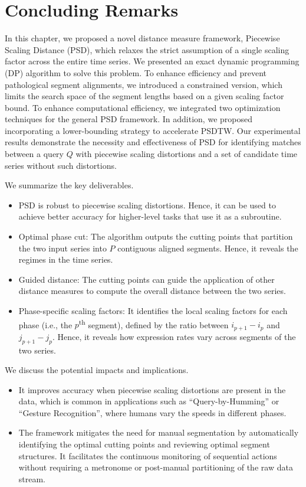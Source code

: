 \section{Concluding Remarks} \label{sec:conclusion} %

In this chapter, we proposed a novel distance measure framework, Piecewise Scaling Distance (PSD), which relaxes the strict assumption of a single scaling factor across the entire time series. 
%
We presented an exact dynamic programming (DP) algorithm to solve this problem.
To enhance efficiency and prevent pathological segment alignments, we introduced a constrained version, which limits the search space of the segment lengths based on a given scaling factor bound. 
%
To enhance computational efficiency, we integrated two optimization techniques for the general PSD framework.
In addition, we proposed incorporating a lower-bounding strategy to accelerate PSDTW.
Our experimental results demonstrate the necessity and effectiveness of PSD for identifying matches between a query $Q$ with piecewise scaling distortions and a set of candidate time series without such distortions.

We summarize the key deliverables.
\begin{itemize}
  \item PSD is robust to piecewise scaling distortions. Hence, it can be used to achieve better accuracy for higher-level tasks that use it as a subroutine.
  \item Optimal phase cut: The algorithm outputs the cutting points that partition the two input series into $P$ contiguous aligned segments.
  Hence, it reveals the regimes in the time series.
  \item Guided distance: The cutting points can guide the application of other distance measures to compute the overall distance between the two series.
  \item Phase-specific scaling factors: It identifies the local scaling factors for each phase (i.e., the $p$\textsuperscript{th} segment), defined by the ratio between $i_{p+1} - i_p$ and $j_{p+1} - j_p$. 
  Hence, it reveals how expression rates vary across segments of the two series.
\end{itemize}

We discuss the potential impacts and implications.
\begin{itemize}
    \item It improves accuracy when piecewise scaling distortions are present in the data, which is common in applications such as ``Query-by-Humming'' or ``Gesture Recognition'', where humans vary the speeds in different phases.
    \item The framework mitigates the need for manual segmentation by automatically identifying the optimal cutting points and reviewing optimal segment structures. 
    It facilitates the continuous monitoring of sequential actions without requiring a metronome or post-manual partitioning of the raw data stream.
\end{itemize}

